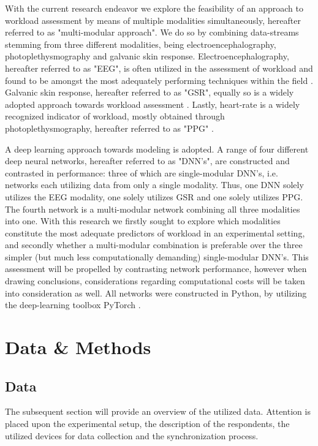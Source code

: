 \documentclass[12pt]{article}
\begin{document}
With the current research endeavor we explore the feasibility of an approach to workload assessment by means of multiple modalities simultaneously, hereafter referred to as "multi-modular approach". We do so by combining data-streams stemming from three different modalities, being electroencephalography, photoplethysmography and galvanic skin response. Electroencephalography,  hereafter referred to as "EEG", is often utilized in the assessment of workload \cite{craik2019deep} \cite{berka2005evaluation} and found to be amongst the most adequately performing techniques within the field \cite{hogervorst2014combining}. Galvanic skin response, hereafter referred to as "GSR", equally so is a widely adopted approach towards workload assessment \cite{nourbakhsh2012using} \cite{zhou2015dynamic}. Lastly, heart-rate is a widely recognized indicator of workload, mostly obtained through photoplethysmography, hereafter referred to as "PPG" \cite{zhang2018evaluating} \cite{jimenez2018using}. 

A deep learning approach towards modeling is adopted. A range of four different deep neural networks, hereafter referred to as "DNN's", are constructed and contrasted in performance: three of which are single-modular DNN's, i.e. networks each utilizing data from only a single modality. Thus,  one DNN solely utilizes the EEG modality,  one solely utilizes GSR and one solely utilizes PPG. The fourth network is a multi-modular network combining all three modalities into one. With this research we firstly sought to explore which modalities constitute the most adequate predictors of workload in an experimental setting, and secondly whether a multi-modular combination is preferable over the three simpler (but much less computationally demanding) single-modular DNN's. This assessment will be propelled by contrasting network performance, however when drawing conclusions, considerations regarding computational costs will be taken into consideration as well. All networks were constructed in Python, by utilizing the deep-learning toolbox PyTorch \cite{paszke2017automatic}. 


\newpage
\section{Data \& Methods}

\subsection{Data}
The subsequent section will provide an overview of the utilized data. Attention is placed upon the experimental setup, the description of the respondents, the utilized devices for data collection and the synchronization process. 
\end{document}
